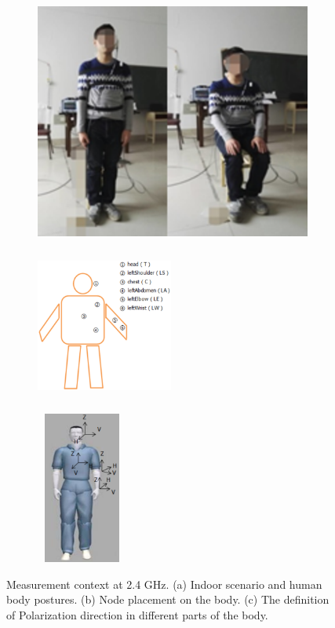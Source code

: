 \documentclass[conference]{IEEEtran}
\begin{document}
\begin{figure}[!t]
  \centering
  \begin{subfigure}[t]{0.3\textwidth}
  \includegraphics[width=\textwidth]{figs/1a.eps}
  \label{fig:volunteer}
  \end{subfigure}
  \begin{subfigure}[t]{0.25\textwidth}
  \includegraphics[width=4.5cm,height=5cm]{figs/1b.eps}
  \label{fig:placement}
  \end{subfigure}
  \begin{subfigure}[t]{0.19\textwidth}
  \includegraphics[width=3cm,height=5cm]{figs/1c.eps}
  \label{fig:polarization_direction}
  \end{subfigure}
\caption{Measurement context at 2.4 GHz. (a) Indoor scenario and human body postures. (b) Node placement on the body. (c) The definition of Polarization direction in different parts of the body.}
\label{fig:human}
\end{figure}
\end{document}
